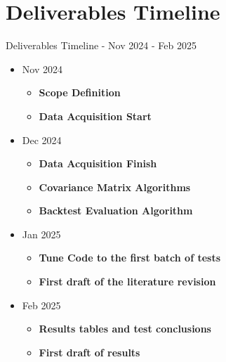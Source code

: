 \documentclass{beamer}
\begin{document}
\section{Deliverables Timeline}
\begin{frame}{Deliverables Timeline - Nov 2024 - Feb 2025}
    \begin{itemize}
        \item Nov 2024 
        \begin{itemize}
            \item \textbf{Scope Definition} %
            \item \textbf{Data Acquisition Start}
        \end{itemize}
        \item Dec 2024
        \begin{itemize}
                \item \textbf{Data Acquisition Finish}
                \item \textbf{Covariance Matrix Algorithms} %
                \item \textbf{Backtest Evaluation Algorithm} %
        \end{itemize}
        \item Jan 2025
        \begin{itemize}
            \item \textbf{Tune Code to the first batch of tests} %
            \item \textbf{First draft of the literature revision}
        \end{itemize}
        \item Feb 2025
            \begin{itemize}
                \item \textbf{Results tables and test conclusions}
                \item \textbf{First draft of results}
            \end{itemize}
    \end{itemize}
\end{frame}
\end{document}
